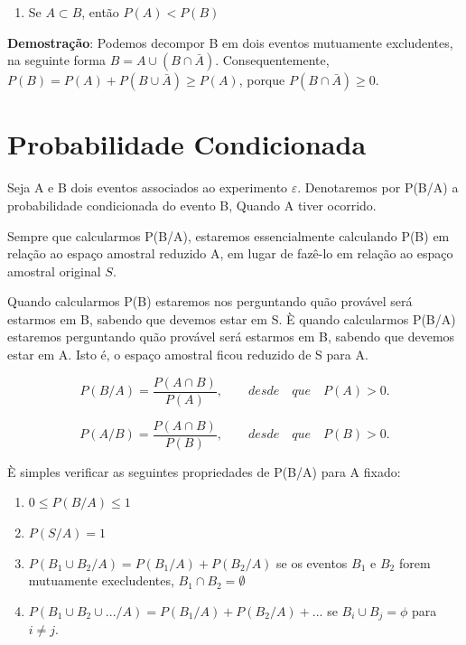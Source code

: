 \documentclass[a4paper,12pt]{report}
\begin{document}
{\begin{enumerate}
    \item Se $A \subset B$, então $P(A) < P(B)$
\end{enumerate}

\textbf{Demostração}: Podemos decompor B em dois eventos
mutuamente excludentes, na seguinte forma $B = A \cup (B \cap
\bar{A})$. Consequentemente, $P(B) = P(A)+ P(B \cup \bar{A}) \geq
P(A)$, porque $P(B \cap \bar{A}) \geq 0$.


\section{Probabilidade Condicionada}

Seja A e B dois eventos associados ao experimento $\varepsilon$.
Denotaremos por P(B/A) a probabilidade condicionada do evento B,
Quando A tiver ocorrido.\vskip0.3cm

Sempre que calcularmos P(B/A), estaremos essencialmente calculando
P(B) em relação ao espaço amostral reduzido A, em lugar de fazê-lo
em relação ao espaço amostral original $S$.\vskip0.3cm

Quando calcularmos P(B) estaremos nos perguntando quão provável
será estarmos em B, sabendo que devemos estar em S. È quando
calcularmos P(B/A) estaremos perguntando quão provável será
estarmos em B, sabendo que devemos estar em A. Isto é, o espaço
amostral ficou reduzido de S para A.



\begin{equation}\label{}
    P(B/A) = \frac{P(A \cap B)}{P(A)}, \quad \quad desde \quad que
    \quad P(A)>0.
\end{equation}

\begin{equation}\label{}
    P(A/B) = \frac{P(A \cap B)}{P(B)}, \quad \quad desde \quad que
    \quad P(B)>0.
\end{equation}

È simples verificar as seguintes propriedades de P(B/A) para A
fixado:

\begin{enumerate}
    \item $0 \leq P(B/A) \leq 1$
    \item $P(S/A)=1$
     \item $P(B_{1} \cup B_{2}/A) = P(B_{1}/A)+P(B_{2}/A)$ se os
     eventos $B_{1}$ e $B_{2}$ forem mutuamente execludentes, $B_{1}\cap B_{2}=\emptyset$
     \item $P(B_{1} \cup B_{2} \cup ... / A) =
     P(B_{1}/A)+P(B_{2}/A)+...$ se $B_{i}\cup B_{j}=\phi$ para $i\neq
     j$.
\end{enumerate}



}
\end{document}
